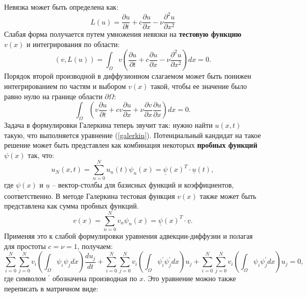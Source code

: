 Невязка может быть определена как:
%
\begin{equation}
    L(u)= \frac{\partial u}{\partial t} + c \frac{\partial u}{\partial x} 
    - \nu \frac{\partial^2 u}{\partial x^2}
\end{equation}
%
Слабая форма получается путем умножения невязки на \textbf{тестовую функцию} $v(x)$ 
и интегрирования по области:
%
\begin{equation}
    (v,L(u))= \int_\Omega v(\frac{\partial u}{\partial t} 
    + c \frac{\partial u}{\partial x} - \nu \frac{\partial^2 u}{\partial x^2})dx = 0.
\end{equation}
%
Порядок второй производной в диффузионном слагаемом может быть понижен 
интегрированием по частям и выбором $v(x)$ такой, чтобы ее значение
было равно нулю на границе области $\partial \Omega$:
\begin{equation}\label{galerkin}
    \int_\Omega (v\frac{\partial u}{\partial t} + cv \frac{\partial u}{\partial x} 
    + \nu \frac{\partial v}{\partial x} \frac{\partial u}{\partial x})dx = 0.
\end{equation}
%
Задача в формулировки Галеркина теперь звучит так: нужно найти $u(x,t)$ такую, 
что выполняется уравнение (\ref{galerkin}).
%
Потенциальный кандидат на такое решение может быть представлен как комбинация некоторых 
\textbf{пробных функций} $\psi(x)$ так, что:
%
\begin{equation}\label{galerkin2}
    u_N(x,t) = \sum_{n=0}^N u_n(t) \psi_n(x) = \underline{\psi}(x)^T \cdot \underline{u}(t),
\end{equation}
%
где $\underline{\psi}(x)$ и $\underline{u}$ -- вектор-столбы для базисных функций и коэффициентов,
соответственно.
%
В методе Галеркина тестовая функция $v(x)$ также может быть представлена как сумма пробных функций.
%
\begin{equation}\label{galerkin3}
    v(x) = \sum_{n=0}^N v_n \psi_n(x) = \underline{\psi}(x)^T \cdot \underline{v}.
\end{equation}
%
Применяя это к слабой формулировки уравнения адвекции-диффузии и полагая для простоты $c=\nu=1$, получаем:
%
\begin{equation}\label{galerkin4}
    \sum_{i=0}^N \sum_{j=0}^N v_i (\int_\Omega \psi_i \psi_j dx) \frac{du_j}{dt} +
    \sum_{i=0}^N \sum_{j=0}^N v_i (\int_\Omega \psi^\prime_i \psi^\prime_j dx) u_j +
    \sum_{i=0}^N \sum_{j=0}^N v_i (\int_\Omega \psi_i \psi^\prime_j dx) u_j = 0,
\end{equation}
%
где символом $^\prime$ обозначена производная по $x$.
%
Это уравнение можно также переписать в матричном виде:
